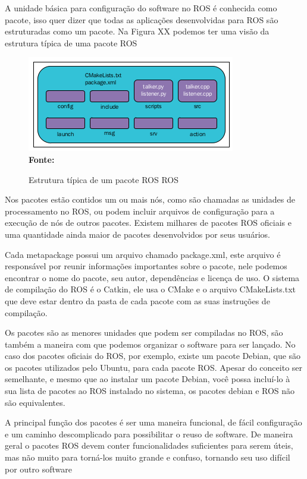 A unidade básica para configuração do software no ROS é conhecida como pacote, isso quer dizer que todas as aplicações desenvolvidas para ROS são estruturadas como um pacote. Na Figura XX podemos ter uma visão da estrutura típica de uma pacote ROS

\begin{figure}[ht]
	\caption{Estrutura típica de um pacote ROS ROS}
	\begin{center}
		\includegraphics[scale=0.8]{imagens/rospackagestruture.png}\\
		{\small \textbf{Fonte:} }
    \end{center}\label{fig:rospacotestrut}
\end{figure}

Nos pacotes estão contidos um ou mais nós, como são chamadas as unidades de processamento no ROS, ou podem incluir arquivos de configuração para a execução de nós de outros pacotes. Existem milhares de pacotes ROS oficiais e uma quantidade ainda maior de pacotes desenvolvidos por seus usuários. 

Cada metapackage possui um arquivo chamado package.xml, este arquivo é responsável por reunir informações importantes sobre o pacote, nele podemos encontrar o nome do pacote, seu autor, dependências e licença de uso. O sistema de compilação do ROS é o Catkin, ele usa o CMake e o arquivo CMakeLists.txt que deve estar dentro da pasta de cada pacote com as suas instruções de compilação. 

Os pacotes são as menores unidades que podem ser compiladas no ROS, são também  a maneira com que podemos organizar o software para ser lançado. No caso dos pacotes oficiais do ROS, por exemplo, existe um pacote Debian, que são os pacotes utilizados pelo Ubuntu, para cada pacote ROS. Apesar do conceito ser semelhante, e mesmo que ao instalar um pacote Debian, você possa incluí-lo à sua lista de pacotes ao ROS instalado no sistema, os pacotes debian e ROS não são equivalentes. 

A principal função dos pacotes é ser uma maneira funcional, de fácil configuração e um caminho descomplicado para possibilitar o reuso de software. De maneira geral o pacotes ROS devem conter funcionalidades suficientes para serem úteis, mas não muito para torná-los muito grande e confuso, tornando seu uso difícil por outro software 


